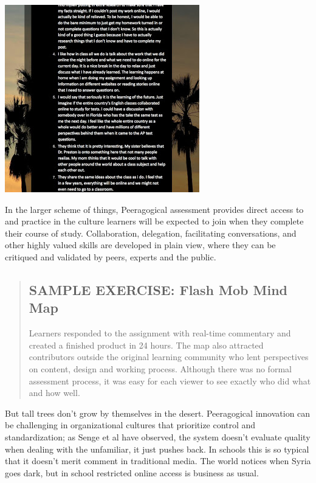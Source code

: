 \begin{center}
\includegraphics{../pictures/fall_reflection2.jpg}
\end{center}

In the larger scheme of things, Peeragogical assessment provides direct
access to and practice in the culture learners will be expected to join
when they complete their course of study. Collaboration, delegation,
facilitating conversations, and other highly valued skills are developed
in plain view, where they can be critiqued and validated by peers,
experts and the public.

\begin{quote}
\subsection{SAMPLE EXERCISE: Flash Mob Mind Map}

Learners responded to the assignment with real-time commentary and
created a finished product in 24 hours. The map also attracted
contributors outside the original learning community who lent
perspectives on content, design and working process. Although there was
no formal assessment process, it was easy for each viewer to see exactly
who did what and how well.

\end{quote}
But tall trees don't grow by themselves in the desert. Peeragogical
innovation can be challenging in organizational cultures that prioritize
control and standardization; as Senge et al have observed, the system
doesn't evaluate quality when dealing with the unfamiliar, it just
pushes back. In schools this is so typical that it doesn't merit comment
in traditional media. The world notices when Syria goes dark, but in
school restricted online access is business as usual.

